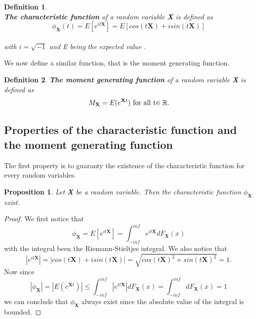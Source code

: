 \documentclass[12pt,travaildirige,nobabel, twoside]{dms}
\numberwithin{equation}{section}
\numberwithin{table}{chapter}
\numberwithin{figure}{chapter}
\newtheorem{mydef}{Definition}[section]
\newtheorem{proposition}{Proposition}[section]
\begin{document}
\begin{mydef}\leavevmode \\
\textbf{The characteristic function} of a random variable \textbf{X} is defined as \\
\begin{equation}
 \phi_\textbf{X}(t)=E[e^{it\textbf{X}}]=E[cos(t\textbf{X})+isin(t\textbf{X})] \end{equation} \\ with \begin{math} i=\sqrt{-1} \end{math} and E being the expected value . \\ 
\end{mydef}
\nocite{lossmodel}
We now define a similar function, that is the moment generating function.\\

\begin{mydef}
\textbf{The moment generating function} of a random variable \textbf{X} is defined as \\
\begin{equation}
M_\textbf{X} =E(e^{\textbf{X}t})   \text{      for all t$ \in\mathbb{R}.$}
\end{equation}
\end{mydef}
\subsection{Properties of the characteristic function and the moment generating function}

The first property is to guaranty the existence of the characteristic function for every random variables.
\begin{proposition}
Let \textbf{X} be a random variable. Then the characteristic function $\phi_\textbf{X}$ exist. 
\end{proposition}
\begin{proof}
We first notice that 
\begin{equation}
\phi_\textbf{X}=E[e^{it\textbf{X}}]=\int_{-inf}^{inf}e^{it\textbf{X}}dF_{\textbf{X}}(x)
\end{equation}
with the integral been the Riemann-Stieltjes integral.
We also notice that
\begin{equation}
|e^{it\textbf{X}}|=|cos(t\textbf{X})+isin(t\textbf{X})|=\sqrt{cos(t\textbf{X})^2+sin(t\textbf{X})^2}=1.
\end{equation}
Now since
\begin{equation}
|\phi_\textbf{X}|=|E(e^{\textbf{X}t})|\leq \int_{-inf}^{inf}|e^{it\textbf{X}}|dF_{\textbf{X}}(x)=\int_{-inf}^{inf}dF_{\textbf{X}}(x)=1
\end{equation}
we can conclude that $\phi_\textbf{X}$ always exist since the absolute value of the integral is bounded\nocite{distquadGNL}.
\end{proof}
\end{document}
